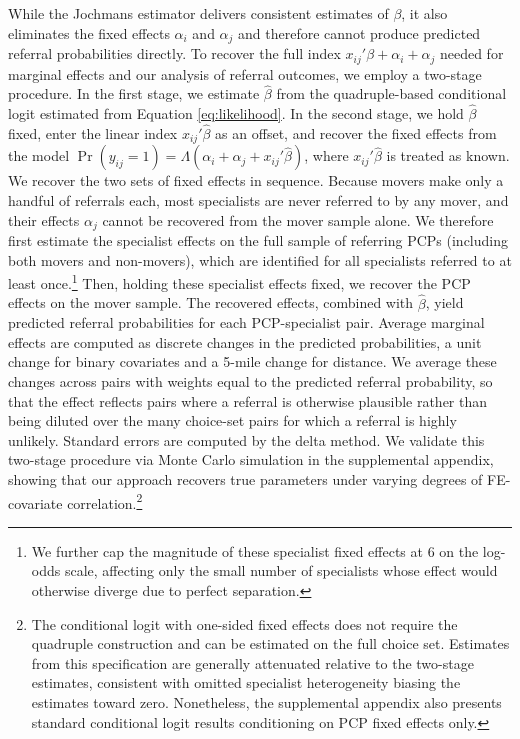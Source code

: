 \documentclass[12pt]{article}
\begin{document}
While the Jochmans estimator delivers consistent estimates of $\beta$, it also eliminates the fixed effects $\alpha_i$ and $\alpha_j$ and therefore cannot produce predicted referral probabilities directly. To recover the full index $x_{ij}'\beta + \alpha_i + \alpha_j$ needed for marginal effects and our analysis of referral outcomes, we employ a two-stage procedure. In the first stage, we estimate $\hat{\beta}$ from the quadruple-based conditional logit estimated from Equation \eqref{eq:likelihood}. In the second stage, we hold $\hat{\beta}$ fixed, enter the linear index $x_{ij}'\hat{\beta}$ as an offset, and recover the fixed effects from the model $\operatorname{Pr}(y_{ij}=1) = \Lambda(\alpha_i + \alpha_j + x_{ij}'\hat{\beta})$, where $x_{ij}'\hat{\beta}$ is treated as known. We recover the two sets of fixed effects in sequence. Because movers make only a handful of referrals each, most specialists are never referred to by any mover, and their effects $\alpha_j$ cannot be recovered from the mover sample alone. We therefore first estimate the specialist effects on the full sample of referring PCPs (including both movers and non-movers), which are identified for all specialists referred to at least once.\footnote{We further cap the magnitude of these specialist fixed effects at 6 on the log-odds scale, affecting only the small number of specialists whose effect would otherwise diverge due to perfect separation.} Then, holding these specialist effects fixed, we recover the PCP effects on the mover sample. The recovered effects, combined with $\hat{\beta}$, yield predicted referral probabilities for each PCP-specialist pair. Average marginal effects are computed as discrete changes in the predicted probabilities, a unit change for binary covariates and a 5-mile change for distance. We average these changes across pairs with weights equal to the predicted referral probability, so that the effect reflects pairs where a referral is otherwise plausible rather than being diluted over the many choice-set pairs for which a referral is highly unlikely. Standard errors are computed by the delta method. We validate this two-stage procedure via Monte Carlo simulation in the supplemental appendix, showing that our approach recovers true parameters under varying degrees of FE-covariate correlation.\footnote{The conditional logit with one-sided fixed effects does not require the quadruple construction and can be estimated on the full choice set. Estimates from this specification are generally attenuated relative to the two-stage estimates, consistent with omitted specialist heterogeneity biasing the estimates toward zero. Nonetheless, the supplemental appendix also presents standard conditional logit results conditioning on PCP fixed effects only.}
\end{document}
